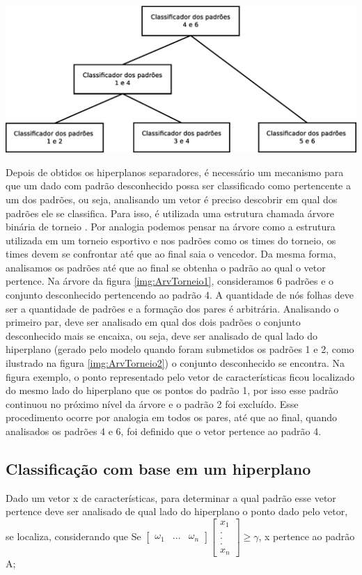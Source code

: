 \begin{center}
	\includegraphics[scale=0.4]{graficos/ArvTorneio2}
	\label{img:ArvTorneio2}
\end{center}
Depois de obtidos os hiperplanos separadores, é necessário um mecanismo para que um dado com padrão desconhecido possa ser classificado como pertencente a um dos padrões, ou seja, analisando um vetor é preciso descobrir em qual dos padrões ele se classifica. Para isso, é utilizada uma estrutura chamada árvore binária de torneio \cite{Feng} \cite{Guo}. Por analogia podemos pensar na árvore como a estrutura utilizada em um torneio esportivo e nos padrões como os times do torneio, os times devem se confrontar até que ao final saia o vencedor. Da mesma forma, analisamos os padrões até que ao final se obtenha o padrão ao qual o vetor pertence.
Na árvore da figura \ref{img:ArvTorneio1}, consideramos 6 padrões e o conjunto desconhecido pertencendo ao padrão 4. A quantidade de nós folhas deve ser a quantidade de padrões e a formação dos pares é arbitrária. Analisando o primeiro par, deve ser analisado em qual dos dois padrões o conjunto desconhecido mais se encaixa, ou seja, deve ser analisado de qual lado do hiperplano (gerado pelo modelo quando foram submetidos os padrões 1 e 2, como ilustrado na figura \ref{img:ArvTorneio2}) o conjunto desconhecido se encontra. Na figura exemplo, o ponto representado pelo vetor de características ficou localizado do mesmo lado do hiperplano que os pontos do padrão 1, por isso esse padrão continuou no próximo nível da árvore e o padrão 2 foi excluído. Esse procedimento ocorre por analogia em todos os pares, até que ao final, quando analisados os padrões 4 e 6, foi definido que o vetor pertence ao padrão 4.

\subsection{Classificação com base em um hiperplano}
Dado um vetor x de características, para determinar a qual padrão esse vetor pertence deve ser analisado de qual lado do hiperplano o ponto dado pelo vetor, se localiza, considerando que 
Se $ \begin{bmatrix}
\omega _{1} & ... & \omega _{n} 
\end{bmatrix}
\begin{bmatrix}
x_{1}
\\ 
.
\\
. 
\\
. 
\\
x_{n}
\end{bmatrix}
\geq \gamma $, x pertence ao padrão A;

